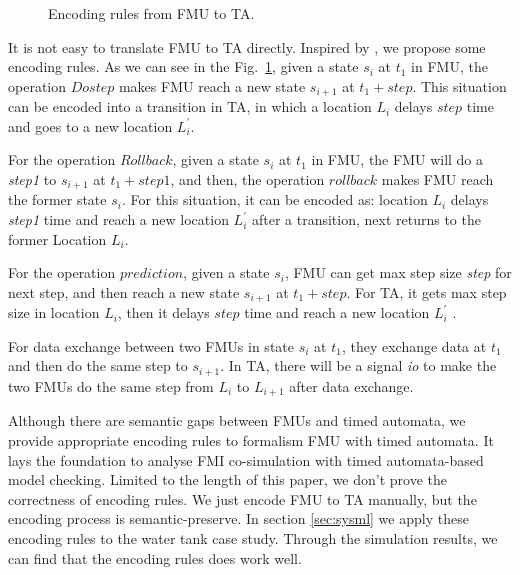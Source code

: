 \begin{figure}[htbp]
	\caption{Encoding rules from FMU to TA.}
	\label{fmutota}
\end{figure}

It is not easy to translate FMU to TA directly. Inspired by \cite{Tripakis15}, we propose some encoding rules. As we can see in the Fig.~\ref{fmutota}, given a state $s_{i}$ at $t_{1}$ in FMU, the operation $Dostep$ makes FMU reach a new state $s_{i+1}$ at $t_{1}+step$. This situation can be encoded into a transition in TA, in which a location $L_{i}$ delays $step$ time and goes to a new location $L_{i}^{\prime}$.

For the operation $Rollback$, given a state $s_{i}$ at $t_{1}$ in FMU, the FMU will do a \emph{step1} to $s_{i+1}$ at $t_{1}+step1$, and then, the operation $rollback$ makes FMU reach the former state $s_{i}$. For this situation, it can be encoded as: location $L_{i}$ delays \emph{step1} time and reach a new location $L_{i}^{\prime}$ after a transition, next returns to the former Location $L_{i}$. 

For the operation $prediction$, given a state $s_{i}$, FMU can get max step size \emph{step} for next step, and then reach a new state $s_{i+1}$ at $t_{1}+step$. For TA, it gets max step size in location $L_{i}$, then it delays $step$ time and reach a new location $L_{i}^{\prime}$ .

For data exchange between two FMUs in state $s_{i}$ at $t_{1}$, they exchange data at $t_{1}$ and then do the same step to $s_{i+1}$. In TA, there will be a signal \emph{io} to make the two FMUs do the same step from $L_{i}$ to $L_{i+1}$ after data exchange.

Although there are semantic gaps between FMUs and timed automata, we provide appropriate encoding rules to formalism FMU with timed automata. It lays the foundation to analyse FMI co-simulation with timed automata-based model checking. Limited to the length of this paper, we don't prove the correctness of encoding rules. We just encode FMU to TA manually, but the encoding process is semantic-preserve. In section \ref{sec:sysml} we apply these encoding rules to the water tank case study. Through the simulation results, we can find that the encoding rules does work well.
